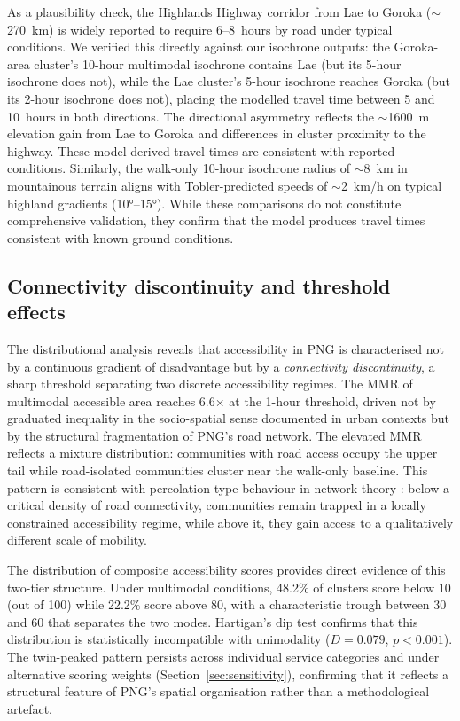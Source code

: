 \documentclass[review,3p,authoryear]{elsarticle}
\begin{document}
As a plausibility check, the Highlands Highway corridor from Lae to Goroka ($\sim$\SI{270}{\kilo\metre}) is widely reported to require 6--8~hours by road under typical conditions. We verified this directly against our isochrone outputs: the Goroka-area cluster's 10-hour multimodal isochrone contains Lae (but its 5-hour isochrone does not), while the Lae cluster's 5-hour isochrone reaches Goroka (but its 2-hour isochrone does not), placing the modelled travel time between 5 and 10~hours in both directions. The directional asymmetry reflects the $\sim$\SI{1600}{\metre} elevation gain from Lae to Goroka and differences in cluster proximity to the highway. These model-derived travel times are consistent with reported conditions. Similarly, the walk-only 10-hour isochrone radius of $\sim$\SI{8}{\kilo\metre} in mountainous terrain aligns with Tobler-predicted speeds of $\sim$\SI{2}{\kilo\metre/\hour} on typical highland gradients (\ang{10}--\ang{15}). While these comparisons do not constitute comprehensive validation, they confirm that the model produces travel times consistent with known ground conditions.

\subsection{Connectivity discontinuity and threshold effects}

The distributional analysis reveals that accessibility in PNG is characterised not by a continuous gradient of disadvantage but by a \textit{connectivity discontinuity}, a sharp threshold separating two discrete accessibility regimes. The MMR of multimodal accessible area reaches 6.6$\times$ at the 1-hour threshold, driven not by graduated inequality in the socio-spatial sense documented in urban contexts \citep{pereira2019, delbosc2011} but by the structural fragmentation of PNG's road network. The elevated MMR reflects a mixture distribution: communities with road access occupy the upper tail while road-isolated communities cluster near the walk-only baseline. This pattern is consistent with percolation-type behaviour in network theory \citep{li2015percolation}: below a critical density of road connectivity, communities remain trapped in a locally constrained accessibility regime, while above it, they gain access to a qualitatively different scale of mobility.

The distribution of composite accessibility scores provides direct evidence of this two-tier structure. Under multimodal conditions, 48.2\% of clusters score below 10 (out of 100) while 22.2\% score above 80, with a characteristic trough between 30 and 60 that separates the two modes. Hartigan's dip test confirms that this distribution is statistically incompatible with unimodality ($D = 0.079$, $p < 0.001$). The twin-peaked pattern persists across individual service categories and under alternative scoring weights (Section~\ref{sec:sensitivity}), confirming that it reflects a structural feature of PNG's spatial organisation rather than a methodological artefact.
\end{document}
